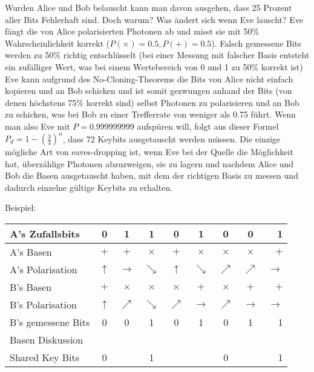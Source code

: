   Wurden Alice und Bob belauscht kann man davon ausgehen, dass 25 Prozent aller Bits Fehlerhaft sind. Doch warum? Was \"andert sich wenn Eve lauscht?
  Eve f\"angt die von Alice polarisierten Photonen ab und misst sie mit 50\% Wahrscheinlichkeit korrekt ($P(\times)=0.5, P(+)=0.5$).
  Falsch gemessene Bits werden zu 50\% richtig entschl\"usselt (bei einer Messung mit falscher Basis entsteht ein zuf\"alliger Wert, was bei einem Wertebereich von 0 und 1 zu 50\% korrekt ist)
  Eve kann aufgrund des No-Cloning-Theorems die Bits von Alice nicht einfach kopieren und an Bob schicken und ist somit gezwungen anhand der Bits (von denen h\"ochstens 75\% korrekt sind) selbst Photonen zu polarisieren und an Bob zu schicken, was bei Bob zu einer Trefferrate von weniger als 0.75 f\"uhrt. Wenn man also Eve mit $P=0.999999999$ aufsp\"uren will, folgt aus dieser Formel $P_d = 1 - \left(\frac{3}{4}\right)^n$, dass 72 Keybits ausgetauscht werden m\"ussen.
  Die einzige m\"ogliche Art von eaves-dropping ist, wenn Eve bei der Quelle die M\"oglichkeit hat, \"uberz\"ahlige Photonen abzuzweigen, sie zu lagern und nachdem Alice und Bob die Basen ausgetauscht haben, mit dem der richtigen Basis zu messen und dadurch einzelne g\"ultige Keybits zu erhalten.\par

  Beispiel:
  \begin{center}
    \begin{tabular}{ l || c | c | c | c | c | c | c | r }
      \hline
      A's Zufallsbits & 0 &  1 & 1 & 0 & 1 & 0 & 0 & 1 \\
      \hline
      A's Basen & $+$ & $+$ & $\times $ & $+$ & $\times $ & $\times $ & $\times $ & $+$ \\
      \hline
      A's Polarisation & $\uparrow$ & $\rightarrow$ & $\searrow$ & $\uparrow$ & $\searrow$ & $\nearrow$ & $\nearrow$ & $\rightarrow$ \\
      \hline
      B's Basen & $+$ & $\times $ & $\times $ & $\times $ & $+$ & $\times $ & $+$ & $+$ \\
      \hline
      B's Polarisation & $\uparrow$ & $\nearrow$ & $\searrow$ & $\nearrow$ & $\rightarrow$ & $\nearrow$ & $\rightarrow$ & $\rightarrow$ \\
      \hline
      B's gemessene Bits & 0 & 0 & 1 & 0 & 1 & 0 & 1 & 1 \\
      \hline
      Basen Diskussion \\
      \hline
      Shared Key Bits& 0 & & 1 & & & 0 & & 1 \\
      \hline
    \end{tabular}
  \end{center}
